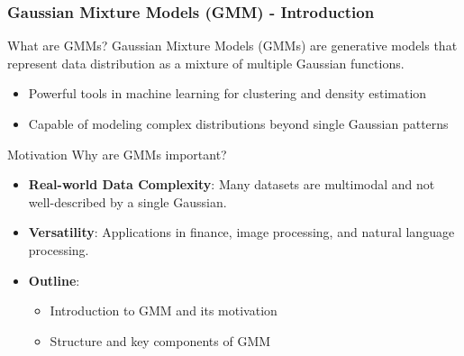 \documentclass[aspectratio=169]{beamer}
\begin{document}
\begin{frame}[fragile]
    \frametitle{Gaussian Mixture Models (GMM) - Introduction}
    \begin{block}{What are GMMs?}
        Gaussian Mixture Models (GMMs) are generative models that represent data distribution as a mixture of multiple Gaussian functions.
    \end{block}
    \begin{itemize}
        \item Powerful tools in machine learning for clustering and density estimation
        \item Capable of modeling complex distributions beyond single Gaussian patterns
    \end{itemize}
    
    \begin{block}{Motivation}
        Why are GMMs important?
    \end{block}
    \begin{itemize}
        \item \textbf{Real-world Data Complexity}: Many datasets are multimodal and not well-described by a single Gaussian.
        \item \textbf{Versatility}: Applications in finance, image processing, and natural language processing.
    \end{itemize}
    
    \begin{itemize}
        \item \textbf{Outline}:
        \begin{itemize}
            \item Introduction to GMM and its motivation
            \item Structure and key components of GMM
        \end{itemize}
    \end{itemize}
\end{frame}
\end{document}
